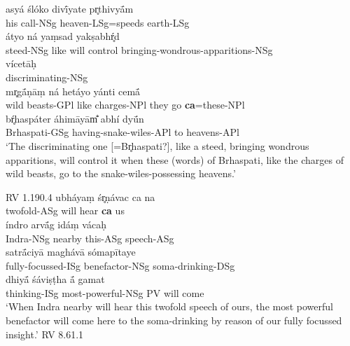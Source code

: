 \documentclass[output=paper,
modfonts
]{LSP/langsci}
\begin{document}
\begin{exe}
\ex\label{lateca}
	\begin{xlist}
	\ex\gll asyá ślóko divī́yate pr̥thivyā́m \\
			his call-NSg heaven-LSg=speeds earth-LSg \\
			
		\gll átyo ná yaṃsad yakṣabhŕ̥d \\
			steed-NSg like {will control} bringing-wondrous-apparitions-NSg \\
			
		\gll \hspace*{1em} vícetāḥ \\
			{} discriminating-NSg \\
			
		\gll mr̥gā́ṇāṃ ná hetáyo yánti cemā́ \\
			{wild beasts-GPl} like charges-NPl {they go} \textbf{ca}=these-NPl \\
		\gll bŕ̥haspáter áhimāyām̐ abhí dyū́n \\
			Brhaspati-GSg having-snake-wiles-APl to heavens-APl \\
		\glt `The discriminating one [=Br̥haspati?], like a steed, bringing wondrous apparitions, will control it when these (words) of Brhaspati, like the charges of wild beasts, go to the snake-wiles-possessing heavens.'
		
		\hfill {RV 1.190.4}
	\ex\gll ubháyaṃ śr̥ṇávac ca na \\
		twofold-ASg {will hear} \textbf{ca} us \\
		
		\gll índro arvā́g idáṃ vácaḥ \\
		Indra-NSg nearby this-ASg speech-ASg \\
		
		\gll satrā́ciyā maghávā sómapītaye \\
			fully-focussed-ISg benefactor-NSg soma-drinking-DSg \\
			
		\gll dhiyā́ śáviṣṭha ā́ gamat \\
			thinking-ISg most-powerful-NSg PV {will come} \\
		\glt `When Indra nearby will hear this twofold speech of ours, the most powerful benefactor will come here to the soma-drinking by reason of our fully focussed insight.' \hfill {RV 8.61.1} \\
	\end{xlist}
\end{exe}
\end{document}
